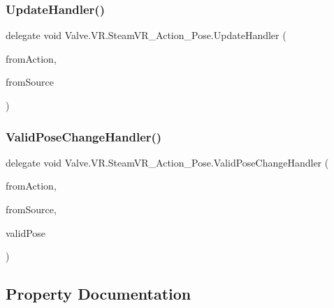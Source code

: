 \subsubsection{\texorpdfstring{UpdateHandler()}{UpdateHandler()}}
{\footnotesize\ttfamily delegate void Valve.\+V\+R.\+Steam\+V\+R\+\_\+\+Action\+\_\+\+Pose.\+Update\+Handler (\begin{DoxyParamCaption}\item[{\mbox{\hyperlink{class_valve_1_1_v_r_1_1_steam_v_r___action___pose}{Steam\+V\+R\+\_\+\+Action\+\_\+\+Pose}}}]{from\+Action,  }\item[{\mbox{\hyperlink{namespace_valve_1_1_v_r_a82e5bf501cc3aa155444ee3f0662853f}{Steam\+V\+R\+\_\+\+Input\+\_\+\+Sources}}}]{from\+Source }\end{DoxyParamCaption})}

\mbox{\label{class_valve_1_1_v_r_1_1_steam_v_r___action___pose_a742270a6bddfea2afd7f535378ae7830}} 
\subsubsection{\texorpdfstring{ValidPoseChangeHandler()}{ValidPoseChangeHandler()}}
{\footnotesize\ttfamily delegate void Valve.\+V\+R.\+Steam\+V\+R\+\_\+\+Action\+\_\+\+Pose.\+Valid\+Pose\+Change\+Handler (\begin{DoxyParamCaption}\item[{\mbox{\hyperlink{class_valve_1_1_v_r_1_1_steam_v_r___action___pose}{Steam\+V\+R\+\_\+\+Action\+\_\+\+Pose}}}]{from\+Action,  }\item[{\mbox{\hyperlink{namespace_valve_1_1_v_r_a82e5bf501cc3aa155444ee3f0662853f}{Steam\+V\+R\+\_\+\+Input\+\_\+\+Sources}}}]{from\+Source,  }\item[{bool}]{valid\+Pose }\end{DoxyParamCaption})}



\subsection{Property Documentation}
\mbox{\label{class_valve_1_1_v_r_1_1_steam_v_r___action___pose_aba7e873fc9c7c419b9ed3f8bef4ddb42}} 
